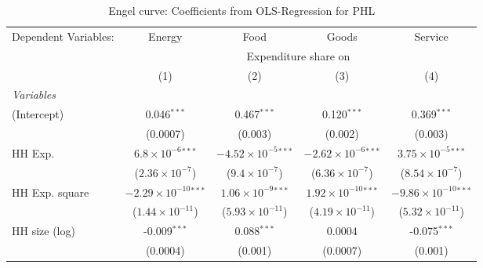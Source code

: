
\begin{table}[htbp!]
   \centering
   \small
   \begin{adjustbox}{width = 1\textwidth, max height = 0.95\textheight, center}
      \begin{threeparttable}[b]
         \caption{\label{tab:Engel_parametric_PHL} Engel curve: Coefficients from OLS-Regression for PHL}
         \begin{tabular}{lcccc}
            \tabularnewline \midrule \midrule
            Dependent Variables: & Energy                          & Food                           & Goods                          & Service\\  
             & \multicolumn{4}{c}{Expenditure share on} \\ 
                                 & (1)                             & (2)                            & (3)                            & (4)\\  
            \midrule
            \emph{Variables}\\
            (Intercept)          & 0.046$^{***}$                   & 0.467$^{***}$                  & 0.120$^{***}$                  & 0.369$^{***}$\\   
                                 & (0.0007)                        & (0.003)                        & (0.002)                        & (0.003)\\   
            HH Exp.              & $6.8\times 10^{-6}$$^{***}$     & $-4.52\times 10^{-5}$$^{***}$  & $-2.62\times 10^{-6}$$^{***}$  & $3.75\times 10^{-5}$$^{***}$\\    
                                 & ($2.36\times 10^{-7}$)          & ($9.4\times 10^{-7}$)          & ($6.36\times 10^{-7}$)         & ($8.54\times 10^{-7}$)\\    
            HH Exp. square       & $-2.29\times 10^{-10}$$^{***}$  & $1.06\times 10^{-9}$$^{***}$   & $1.92\times 10^{-10}$$^{***}$  & $-9.86\times 10^{-10}$$^{***}$\\    
                                 & ($1.44\times 10^{-11}$)         & ($5.93\times 10^{-11}$)        & ($4.19\times 10^{-11}$)        & ($5.32\times 10^{-11}$)\\    
            HH size (log)        & -0.009$^{***}$                  & 0.088$^{***}$                  & 0.0004                         & -0.075$^{***}$\\   
                                 & (0.0004)                        & (0.001)                        & (0.0007)                       & (0.001)\\   

\end{tabular}
\end{threeparttable}
\end{adjustbox}
\end{table}
